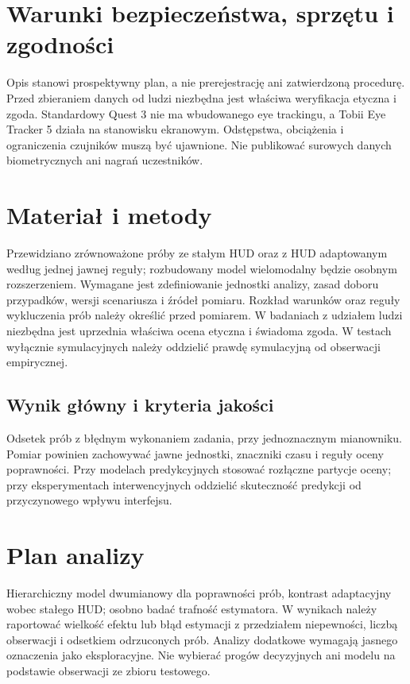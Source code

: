 \documentclass[11pt,a4paper]{article}
\begin{document}
\section{Warunki bezpieczeństwa, sprzętu i zgodności}
Opis stanowi prospektywny plan, a nie prerejestrację ani zatwierdzoną procedurę. Przed zbieraniem danych od ludzi niezbędna jest właściwa weryfikacja etyczna i zgoda. Standardowy Quest 3 nie ma wbudowanego eye trackingu, a Tobii Eye Tracker 5 działa na stanowisku ekranowym. Odstępstwa, obciążenia i ograniczenia czujników muszą być ujawnione. Nie publikować surowych danych biometrycznych ani nagrań uczestników.

\section{Materiał i metody}

Przewidziano zrównoważone próby ze stałym HUD oraz z HUD adaptowanym według jednej jawnej reguły; rozbudowany model wielomodalny będzie osobnym rozszerzeniem. Wymagane jest zdefiniowanie jednostki analizy, zasad doboru przypadków, wersji scenariusza i źródeł pomiaru. Rozkład warunków oraz reguły wykluczenia prób należy określić przed pomiarem. W badaniach z udziałem ludzi niezbędna jest uprzednia właściwa ocena etyczna i świadoma zgoda. W testach wyłącznie symulacyjnych należy oddzielić prawdę symulacyjną od obserwacji empirycznej.

\subsection{Wynik główny i kryteria jakości}

Odsetek prób z błędnym wykonaniem zadania, przy jednoznacznym mianowniku. Pomiar powinien zachowywać jawne jednostki, znaczniki czasu i reguły oceny poprawności. Przy modelach predykcyjnych stosować rozłączne partycje oceny; przy eksperymentach interwencyjnych oddzielić skuteczność predykcji od przyczynowego wpływu interfejsu.

\section{Plan analizy}

Hierarchiczny model dwumianowy dla poprawności prób, kontrast adaptacyjny wobec stałego HUD; osobno badać trafność estymatora. W wynikach należy raportować wielkość efektu lub błąd estymacji z przedziałem niepewności, liczbą obserwacji i odsetkiem odrzuconych prób. Analizy dodatkowe wymagają jasnego oznaczenia jako eksploracyjne. Nie wybierać progów decyzyjnych ani modelu na podstawie obserwacji ze zbioru testowego.
\end{document}
